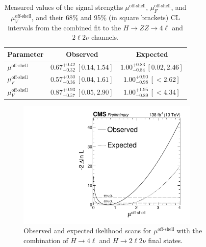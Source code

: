 \begin{table}[!hbt]
\centering
\begin{tabular}{lcc}
  Parameter                & {Observed}          &  {Expected}   \\
  \hline
  $\mu^\text{off-shell}$ &  $0.67^{+ 0.42}_{-0.32 }\ [0.14,1.54]$ & $1.00^{+ 0.83}_{-0.84}\ [0.02,2.46]$ \\
  $\mu_F^\text{off-shell}$ &  $0.57^{+ 0.50}_{- 0.36}\ [0.04,1.61]$ & $1.00^{+0.90}_{-0.98}\ [{<}2.62]$\\
  $\mu_V^\text{off-shell}$ &  $ 0.87^{+0.93}_{-0.57}\ [0.05,2.90]$ & $1.00^{+1.95}_{-0.89}\ [{<}4.34]$ \\
\end{tabular}
\caption{
  Measured values of the signal strengths $\mu^\text{off-shell}$, $\mu_F^\text{off-shell}$, and $\mu_V^\text{off-shell}$,
  and their 68\% and 95\% (in square brackets) CL intervals from the combined fit to the \offshell $H\to ZZ\to4\ell$ and $2\ell2\nu$ channels.
}
\label{table:muoffshell}
\end{table}

\begin{figure}[!hbt]
\begin{center}
\includegraphics[width=0.8\textwidth]{figures/scan_Roff_upd.pdf}
\caption
{
Observed and expected ikelihood scans for $\mu^{\text{off-shell}}$ with the combination of $H\to4\ell$ and $H\to2\ell2\nu$ final states.
\label{fig:1Dmus_off}
}
\end{center}
\end{figure}

